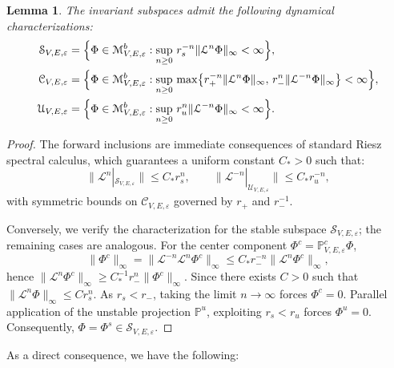 \documentclass[reqno,11pt]{amsart}
\newtheorem{lemma}{Lemma}[section]
\begin{document}
\begin{lemma}
\label{prop:growth}
The invariant subspaces admit the following  dynamical characterizations:
$$
\begin{aligned}
\mathcal{S}_{V,E,\varepsilon} &= \Bigl\{ \Phi\in \mathcal{M}_{V,E,\varepsilon}^b : \sup_{n\ge 0} \, r_s^{-n} \|\mathcal{L}^n\Phi\|_\infty < \infty \Bigr\}, \\
\mathcal{C}_{V,E,\varepsilon} &= \Bigl\{ \Phi\in \mathcal{M}_{V,E,\varepsilon}^b : \sup_{n\ge 0} \, \max\bigl\{ r_+^{-n} \|\mathcal{L}^n\Phi\|_\infty, \, r_-^n \|\mathcal{L}^{-n}\Phi\|_\infty \bigr\} < \infty \Bigr\}, \\
\mathcal{U}_{V,E,\varepsilon} &= \Bigl\{ \Phi\in \mathcal{M}_{V,E,\varepsilon}^b : \sup_{n\ge 0} \, r_u^n \|\mathcal{L}^{-n}\Phi\|_\infty < \infty \Bigr\}.
\end{aligned}
$$
\end{lemma}


\begin{proof}The forward inclusions are immediate consequences of standard Riesz spectral calculus, which guarantees a uniform constant $C_* > 0$ such that:
$$\|\mathcal{L}^n|_{\mathcal{S}_{V,E,\varepsilon}}\| \le C_* r_s^n, \qquad
\|\mathcal{L}^{-n}|_{\mathcal{U}_{V,E,\varepsilon}}\| \le C_* r_u^{-n},$$
with symmetric bounds on $\mathcal{C}_{V,E,\varepsilon}$ governed by $r_+$ and $r_-^{-1}$.

Conversely, we verify the characterization for the stable subspace $\mathcal{S}_{V,E,\varepsilon}$; the remaining cases are  analogous. 
For the center component $\Phi^c =\mathbb{P}^c_{V,E,\varepsilon}\Phi$, 
$$
\|\Phi^c\|_\infty
=\|\mathcal{ L }^{-n}\mathcal{ L }^{n}\Phi^c\|_\infty\leq
C_* r_-^{-n}\|\mathcal{ L }^{n}\Phi^c\|_\infty,
$$
hence
$
\|\mathcal{ L }^{n}\Phi^c\|_\infty\ge
C_*^{-1} r_-^{n}\|\Phi^c\|_\infty.
$
Since  there exists $C>0$ such that
$
\|\mathcal{ L }^{n}\Phi\|_\infty\leq C r_s^n.
$
As $r_s < r_-$, taking the limit $n \to \infty$ forces $\Phi^c = 0$. Parallel application of the unstable projection $\mathbb{P}^u$, exploiting  $r_s < r_u$ forces $\Phi^u = 0$. Consequently, $\Phi = \Phi^s \in \mathcal{S}_{V,E,\varepsilon}$.
\end{proof}

As a direct consequence, we have the following:
\end{document}
